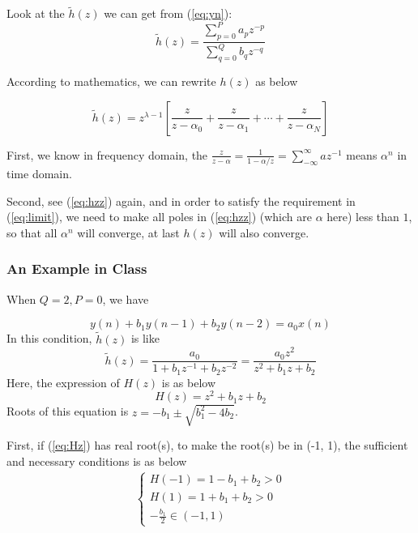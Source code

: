 \documentclass{article}
\begin{document}
Look at the $\tilde{h}(z)$ we can get from (\ref{eq:yn}):
\begin{equation}
	\tilde{h}(z) = \frac{\sum_{p = 0}^{P}a_p z^{-p}}{\sum_{q = 0}^{Q} b_q z^{-q}}
	\label{eq:hz}
\end{equation}

According to mathematics, we can rewrite $h(z)$ as below

\begin{equation}
\tilde{h}(z) = z^{\lambda - 1} \left[ \frac{z}{z - \alpha_0} + \frac{z}{z - \alpha_1 } + \cdots + \frac{z}{z - \alpha_N } \right]
\label{eq:hzz}
\end{equation}

First, we know in frequency domain, the $\frac{z}{z - \alpha} = \frac{1}{1 - \alpha/z} = \sum_{- \infty}^{\infty} az^{-1}$ means $\alpha^n$ in time domain.

Second, see (\ref{eq:hzz}) again, and in order to satisfy the requirement in (\ref{eq:limit}), we need to make all poles in (\ref{eq:hzz}) (which are $\alpha$ here) less than $1$, so that all $\alpha^n$ will converge, at last $h(z)$ will also converge.

\subsubsection{An Example in Class}
When $Q = 2, P = 0$, we have

\begin{equation}
y(n) + b_1y(n - 1) + b_2y(n - 2) = a_0 x(n)
\label{eq:yxExample}
\end{equation}
In this condition, $\tilde{h}(z)$ is like 
\begin{equation}
\tilde{h}(z) = \frac{a_0}{1 + b_1 z^{-1} + b_2 z^{-2}} = \frac{a_0 z^2}{z^2 + b_1 z + b_2}
\label{eq:hzExample}
\end{equation}
Here, the expression of $H(z)$ is as below
\begin{equation}
H(z) = z^2 + b_1 z + b_2
\label{eq:Hz}
\end{equation}
Roots of this equation is $z = -b_1 \pm \sqrt{b_1^2 - 4 b_2}$.

First, if (\ref{eq:Hz}) has real root(s), to make the root(s) be in (-1, 1), the sufficient and necessary conditions is as below
\begin{align*}
	\begin{cases}
		H(-1) = 1 - b_1 + b_2 > 0 \\ 
		H(1) = 1 + b_1 + b_2 > 0 \\ 
		- \frac{b_1}{2} \in (-1, 1)
	\end{cases}
\end{align*}
\end{document}
